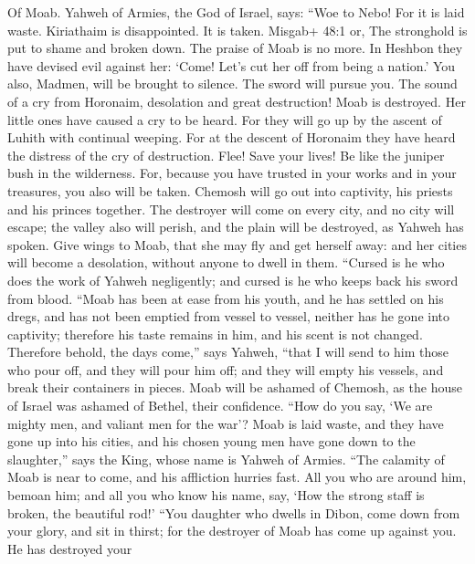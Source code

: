  Of Moab. Yahweh of Armies, the God of Israel, says: ``Woe
to Nebo! For it is laid waste. Kiriathaim is disappointed. It is taken.
Misgab+ 48:1 or, The stronghold is put to shame and broken down.
 The praise of Moab is no more. In Heshbon they have devised
evil against her: `Come! Let's cut her off from being a nation.' You
also, Madmen, will be brought to silence. The sword will pursue you.
 The sound of a cry from Horonaim, desolation and great
destruction!  Moab is destroyed. Her little ones have caused
a cry to be heard.  For they will go up by the ascent of
Luhith with continual weeping. For at the descent of Horonaim they have
heard the distress of the cry of destruction.  Flee! Save
your lives! Be like the juniper bush in the wilderness. 
For, because you have trusted in your works and in your treasures, you
also will be taken. Chemosh will go out into captivity, his priests and
his princes together.  The destroyer will come on every
city, and no city will escape; the valley also will perish, and the
plain will be destroyed, as Yahweh has spoken.  Give wings
to Moab, that she may fly and get herself away: and her cities will
become a desolation, without anyone to dwell in them. 
``Cursed is he who does the work of Yahweh negligently; and cursed is he
who keeps back his sword from blood.  ``Moab has been at
ease from his youth, and he has settled on his dregs, and has not been
emptied from vessel to vessel, neither has he gone into captivity;
therefore his taste remains in him, and his scent is not changed.
 Therefore behold, the days come,'' says Yahweh, ``that I
will send to him those who pour off, and they will pour him off; and
they will empty his vessels, and break their containers in pieces.
 Moab will be ashamed of Chemosh, as the house of Israel
was ashamed of Bethel, their confidence.  ``How do you say,
`We are mighty men, and valiant men for the war'?  Moab is
laid waste, and they have gone up into his cities, and his chosen young
men have gone down to the slaughter,'' says the King, whose name is
Yahweh of Armies.  ``The calamity of Moab is near to come,
and his affliction hurries fast.  All you who are around
him, bemoan him; and all you who know his name, say, `How the strong
staff is broken, the beautiful rod!'  ``You daughter who
dwells in Dibon, come down from your glory, and sit in thirst; for the
destroyer of Moab has come up against you. He has destroyed your
